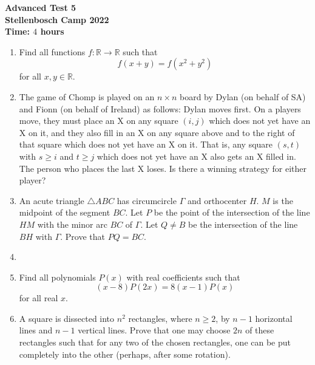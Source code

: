 \documentclass{article}
\begin{document}
\thispagestyle{empty}

\begin{center}
  \textbf{\Large Advanced Test 5}
  \\ \vspace{1em}
  \textbf{\large Stellenbosch Camp 2022}
  \\ \vspace{1em}
  \textbf{\large Time: $4$ hours}
\end{center}

\bigskip

\begin{enumerate}[itemsep=\fill]

\item %
Find all functions $f : \mathbb{R} \to \mathbb{R}$ such that \[ f(x+y) = f(x^2+y^2) \] for all $x,y \in \mathbb{R}$.

 
\item %
The game of Chomp is played on an $n \times n$ board by Dylan (on behalf of SA) and Fionn (on behalf of Ireland) as follows: Dylan moves first.
On a players move, they must place an X on any square $(i, j)$ which does not yet have an X on it, and they also fill in an X on any square above and to the right of that square which does not yet have an X on it.
That is, any square $(s, t)$ with $s \geq i$ and $t \geq j$ which does not yet have an X also gets an X filled in.
The person who places the last X loses.
Is there a winning strategy for either player?


\item %
An acute triangle $\triangle ABC$ has circumcircle $\Gamma$ and orthocenter $H$.
$M$ is the midpoint of the segment $BC$.
Let $P$ be the point of the intersection of the line $HM$ with the minor arc $BC$ of $\Gamma$.
Let $Q \neq B$ be the intersection of the line $BH$ with $\Gamma$.
Prove that $PQ = BC$.


\item %


\item %
Find all polynomials $P(x)$ with real coefficients such that
\[ (x-8)P(2x) = 8(x-1)P(x) \]
for all real $x$.


\item %
A square is dissected into $n^2$ rectangles, where $n\geq 2$, by $n-1$ horizontal lines and $n-1$ vertical lines.
Prove that one may choose $2n$ of these rectangles such that for any two of the chosen rectangles, one can be put completely into the other (perhaps, after some rotation).

\end{enumerate}
\end{document}
